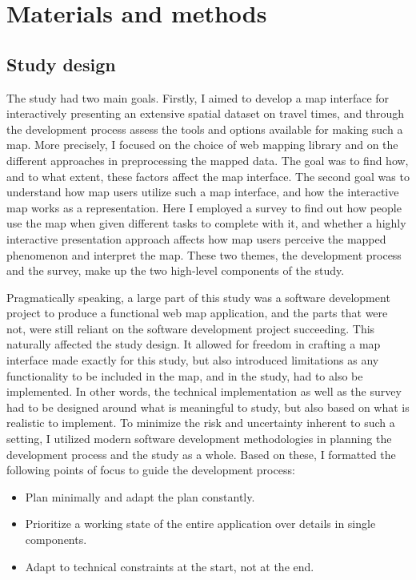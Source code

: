 \section{Materials and methods}

\subsection{Study design}

The study had two main goals.
Firstly, I aimed to develop a map interface for
interactively presenting an extensive spatial dataset on travel times,
and through the development process assess
the tools and options available for making such a map.
More precisely,
I focused on the choice of web mapping library
and on the different approaches in preprocessing the mapped data.
The goal was to find how,
and to what extent,
these factors affect the map interface.
The second goal was to understand how map users utilize such a map interface,
and how the interactive map works as a representation.
Here I employed a survey to find out how
people use the map when given different tasks to complete with it,
and whether a highly interactive presentation approach affects
how map users perceive the mapped phenomenon and interpret the map.
These two themes, the development process and the survey,
make up the two high-level components of the study.


Pragmatically speaking, a large part of this study was
a software development project to produce a functional web map application,
and the parts that were not, were still reliant on
the software development project succeeding.
This naturally affected the study design.
It allowed for freedom in crafting a map interface made exactly for this study,
but also introduced limitations
as any functionality to be included in the map, and in the study,
had to also be implemented.
In other words, the technical implementation as well as the survey
had to be designed around what is meaningful to study,
but also based on what is realistic to implement.
To minimize the risk and uncertainty inherent to such a setting,
I utilized modern software development methodologies
\parencite{mar2009, saq2020, bec2001, sha2017, kuh2017}
in planning the development process and the study as a whole.
Based on these,
I formatted the following points of focus
to guide the development process:
\begin{itemize}
	\item Plan minimally and adapt the plan constantly.
	\item Prioritize a working state of the entire application over details in single components.
	\item Adapt to technical constraints at the start, not at the end.
\end{itemize}

